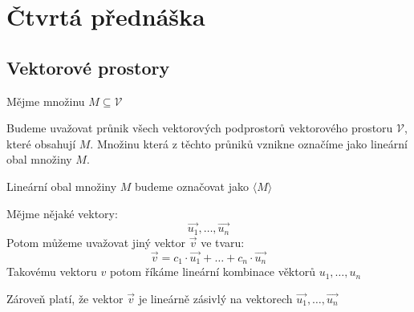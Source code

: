 \section{Čtvrtá přednáška}
\subsection{Vektorové prostory}

\begin{definition}
    Mějme množinu $M \subseteq \mathcal{V}$

    Budeme uvažovat průnik všech vektorových podprostorů vektorového prostoru $\mathcal{V}$,
    které obsahují $M$. Množinu která z těchto průniků vznikne označíme jako lineární obal
    množiny $M$.

    Lineární obal množiny $M$ budeme označovat jako $\langle M \rangle$
\end{definition}

\begin{definition}
    Mějme nějaké vektory:
    $$\vec{u_1}, \ldots, \vec{u_n}$$
    Potom můžeme uvažovat jiný vektor $\vec{v}$ ve tvaru:
    $$\vec{v} = c_1 \cdot \vec{u_1} + \ldots + c_n \cdot \vec{u_n}$$
    Takovému vektoru $v$ potom říkáme lineární kombinace věktorů $u_1, \ldots, u_n$

    Zároveň platí, že vektor $\vec{v}$ je lineárně zásivlý na vektorech
        $\vec{u_1}, \ldots, \vec{u_n}$
\end{definition}

